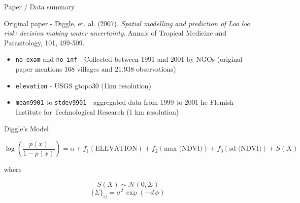 \documentclass[11pt,ignorenonframetext,]{beamer}
\providecommand{\tightlist}{%
  \setlength{\itemsep}{0pt}\setlength{\parskip}{0pt}}
\begin{document}
\begin{frame}[fragile]{Paper / Data summary}

Original paper - Diggle, et. al. (2007). \emph{Spatial modelling and
prediction of Loa loa risk: decision making under uncertainty}. Annals
of Tropical Medicine and Parasitology, 101, 499-509.

\vspace{4mm}

\begin{itemize}
\tightlist
\item
  \texttt{no\_exam} and \texttt{no\_inf} - Collected between 1991 and
  2001 by NGOs (original paper mentions 168 villages and 21,938
  observations)
\end{itemize}

\vspace{2mm}

\begin{itemize}
\tightlist
\item
  \texttt{elevation} - USGS gtopo30 (1km resolution)
\end{itemize}

\vspace{2mm}

\begin{itemize}
\tightlist
\item
  \texttt{mean9901} to \texttt{stdev9901} - aggregated data from 1999 to
  2001 he Flemish Institute for Technological Research (1 km resolution)
\end{itemize}

\end{frame}

\begin{frame}{Diggle's Model}

\[ \log \left( \frac{p(x)}{1-p(x)} \right) = \alpha + f_1(\text{ELEVATION}) + f_2(\text{max (NDVI)}) + f_3(\text{sd (NDVI)}) + S(X) \]

where

\[ S(X) \sim \mathcal{N}(0, \Sigma) \]
\[ \{\Sigma\}_{ij} = \sigma^2 \, \exp(-d \,\phi) \]

\end{frame}
\end{document}

